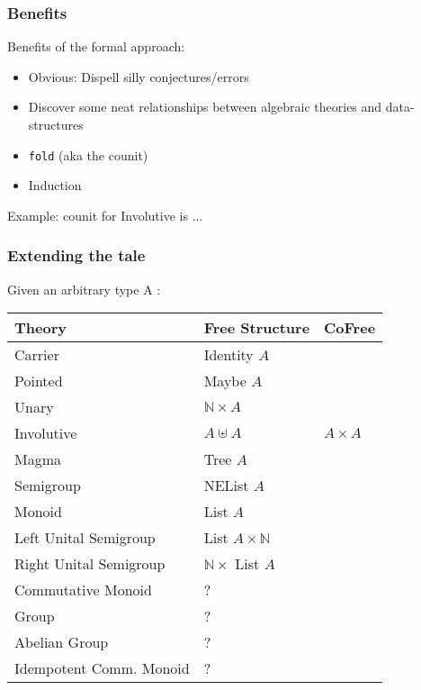 \documentclass[serif,mathserif,professionalfont,10pt]{beamer}
\newcommand{\sred}[1]{\textcolor{slidered}{#1}}
\begin{document}
\begin{frame}
\frametitle{Benefits}
Benefits of the formal approach:
\begin{itemize}
\item Obvious: Dispell silly conjectures/errors
\item Discover some neat relationships between algebraic theories and data-structures
\item \texttt{fold} (aka the counit)
\item Induction
\end{itemize} \vspace*{4mm}
\pause
Example: counit for Involutive is ...
\vfill
\end{frame}

\begin{frame}
\frametitle{Extending the tale}
Given an arbitrary type A : \\ \vspace*{4mm}
\begin{tabular}{lll}
\textbf{Theory} & \textbf{Free Structure} & CoFree \\ \hline
Carrier & Identity $A$ & \\
Pointed & Maybe $A$ & \\ \hline
Unary & $ℕ × A$ &  \\
Involutive & $A ⊎ A$ & $A × A$ \\ \hline
Magma & Tree $A$ &  \\
Semigroup & NEList $A$ & \\ \hline
Monoid & List $A$ & \\
Left Unital Semigroup & List $A × ℕ$ & \\
Right Unital Semigroup & $ℕ ×$ List $A$ & \\ \hline
\sred{Commutative Monoid} & \sred{?} & \\
\sred{Group} & \sred{?} & \\
\sred{Abelian Group} & \sred{?} & \\
\sred{Idempotent Comm. Monoid} & \sred{?} & \\
\end{tabular}
\end{frame}
\end{document}

